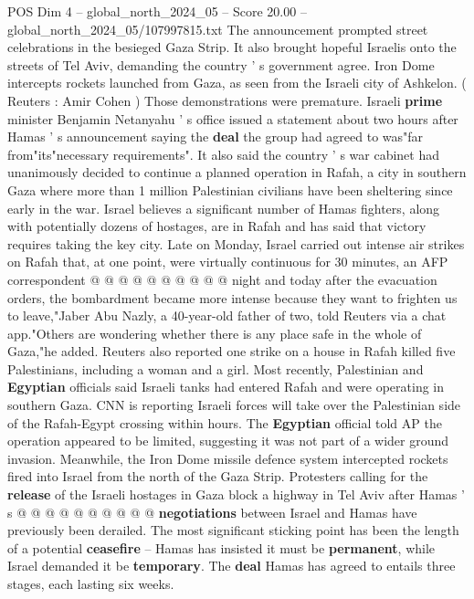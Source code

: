\begin{textsample}{POS Dim 4 – global\_north\_2024\_05 – Score 20.00 – global\_north\_2024\_05/107997815.txt}  \label{ex:f4_pos_340}
The announcement prompted street celebrations in the besieged Gaza Strip.
It also brought hopeful Israelis onto the streets of Tel Aviv, demanding the country ' s government agree.
Iron Dome intercepts rockets launched from Gaza, as seen from the Israeli city of Ashkelon. ( Reuters : Amir Cohen ) Those demonstrations were premature.
Israeli \textbf{prime} minister Benjamin Netanyahu ' s office issued a statement about two hours after Hamas ' s announcement saying the \textbf{deal} the group had agreed to was"far from"its"necessary requirements".
It also said the country ' s war cabinet had unanimously decided to continue a planned operation in Rafah, a city in southern Gaza where more than 1 million Palestinian civilians have been sheltering since early in the war.
Israel believes a significant number of Hamas fighters, along with potentially dozens of hostages, are in Rafah and has said that victory requires taking the key city.
Late on Monday, Israel carried out intense air strikes on Rafah that, at one point, were virtually continuous for 30 minutes, an AFP correspondent @ @ @ @ @ @ @ @ @ @ night and today after the evacuation orders, the bombardment became more intense because they want to frighten us to leave,"Jaber Abu Nazly, a 40-year-old father of two, told Reuters via a chat app."Others are wondering whether there is any place safe in the whole of Gaza,"he added.
Reuters also reported one strike on a house in Rafah killed five Palestinians, including a woman and a girl.
Most recently, Palestinian and \textbf{Egyptian} officials said Israeli tanks had entered Rafah and were operating in southern Gaza.
CNN is reporting Israeli forces will take over the Palestinian side of the Rafah-Egypt crossing within hours.
The \textbf{Egyptian} official told AP the operation appeared to be limited, suggesting it was not part of a wider ground invasion.
Meanwhile, the Iron Dome missile defence system intercepted rockets fired into Israel from the north of the Gaza Strip.
Protesters calling for the \textbf{release} of the Israeli hostages in Gaza block a highway in Tel Aviv after Hamas ' s @ @ @ @ @ @ @ @ @ @ \textbf{negotiations} between Israel and Hamas have previously been derailed.
The most significant sticking point has been the length of a potential \textbf{ceasefire} -- Hamas has insisted it must be \textbf{permanent}, while Israel demanded it be \textbf{temporary}.
The \textbf{deal} Hamas has agreed to entails three stages, each lasting six weeks.

\end{textsample}
